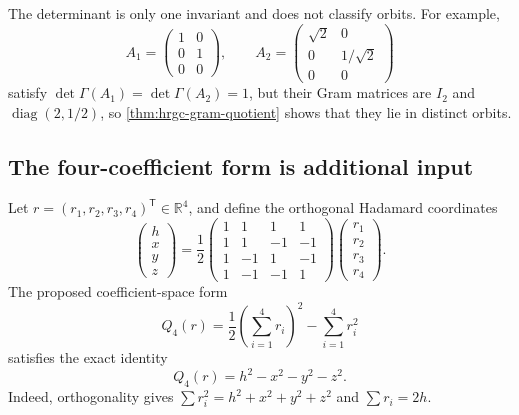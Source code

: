 The determinant is only one invariant and does not classify orbits.  For
example,
\[
 A_1=\begin{pmatrix}1&0\\0&1\\0&0\end{pmatrix},
 \qquad
 A_2=\begin{pmatrix}\sqrt2&0\\0&1/\sqrt2\\0&0\end{pmatrix}
\]
satisfy \(\det\Gamma(A_1)=\det\Gamma(A_2)=1\), but their Gram matrices are
\(I_2\) and \(\operatorname{diag}(2,1/2)\), so
\cref{thm:hrgc-gram-quotient} shows that they lie in distinct orbits.

\subsection{The four-coefficient form is additional input}

Let \(r=(r_1,r_2,r_3,r_4)^{\mathsf T}\in\mathbb R^4\), and define the
orthogonal Hadamard coordinates
\begin{equation}
 \begin{pmatrix}h\\x\\y\\z\end{pmatrix}
 =\frac12
 \begin{pmatrix}
 1&1&1&1\\
 1&1&-1&-1\\
 1&-1&1&-1\\
 1&-1&-1&1
 \end{pmatrix}
 \begin{pmatrix}r_1\\r_2\\r_3\\r_4\end{pmatrix}.
 \label{eq:hrgc-hadamard-transform}
\end{equation}
The proposed coefficient-space form
\begin{equation}
 Q_4(r)=\frac12\left(\sum_{i=1}^4r_i\right)^2-
 \sum_{i=1}^4r_i^2
 \label{eq:hrgc-q4-definition}
\end{equation}
satisfies the exact identity
\begin{equation}
 Q_4(r)=h^2-x^2-y^2-z^2.
 \label{eq:hrgc-q4-lorentz}
\end{equation}
Indeed, orthogonality gives
\(\sum r_i^2=h^2+x^2+y^2+z^2\) and
\(\sum r_i=2h\).

